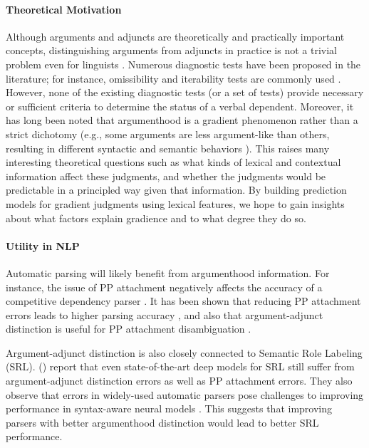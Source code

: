 \documentclass[letterpaper]{article} %
\begin{document}
\paragraph{Theoretical Motivation} Although arguments and adjuncts are theoretically and practically important concepts, distinguishing arguments from adjuncts in practice is not a trivial problem even for linguists \cite{schutze1995pp}. Numerous diagnostic tests have been proposed in the literature; for instance, omissibility and iterability tests are commonly used \cite{pollard1987information}. However, none of the existing diagnostic tests (or a set of tests) provide necessary or sufficient criteria to determine the status of a verbal dependent. Moreover, it has long been noted that argumenthood is a gradient phenomenon rather than a strict dichotomy (e.g., some arguments are less argument-like than others, resulting in different syntactic and semantic behaviors \cite{rissman2015using}). This raises many interesting theoretical questions such as what kinds of lexical and contextual information affect these judgments, and whether the judgments would be predictable in a principled way given that information. By building prediction models for gradient judgments using lexical features, we hope to gain insights about what factors explain gradience and to what degree they do so.

\paragraph{Utility in NLP} Automatic parsing will likely benefit from argumenthood information. For instance, the issue of PP attachment negatively affects the accuracy of a competitive dependency parser \cite{dasigi2017ontology}. It has been shown that reducing PP attachment errors leads to higher parsing accuracy \cite{agirre2008improving,belinkov2014exploring}, and also that argument-adjunct distinction is useful for PP attachment disambiguation \cite{merlo2006notion}. 

Argument-adjunct distinction is also closely connected to Semantic Role Labeling (SRL). \citeauthor{he2017deep} (\citeyear{he2017deep}) report that even state-of-the-art deep models for SRL still suffer from argument-adjunct distinction errors as well as PP attachment errors. They also observe that errors in widely-used automatic parsers pose challenges to improving performance in syntax-aware neural models \cite{marcheggiani2017encoding}. This suggests that improving parsers with better argumenthood distinction would lead to better SRL performance.
\end{document}
